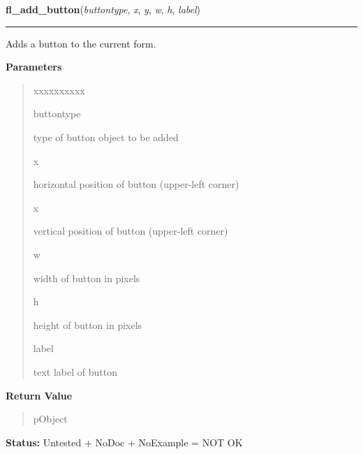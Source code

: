     \label{xformslib:library:fl_add_button}

    \vspace{0.5ex}

\hspace{.8\funcindent}\begin{boxedminipage}{\funcwidth}

    \raggedright \textbf{fl\_add\_button}(\textit{buttontype}, \textit{x}, \textit{y}, \textit{w}, \textit{h}, \textit{label})

    \vspace{-1.5ex}

    \rule{\textwidth}{0.5\fboxrule}
\setlength{\parskip}{2ex}
    Adds a button to the current form.

\setlength{\parskip}{1ex}
      \textbf{Parameters}
      \vspace{-1ex}

      \begin{quote}
        \begin{Ventry}{xxxxxxxxxx}

          \item[buttontype]

          type of button object to be added

          \item[x]

          horizontal position of button (upper-left corner)

          \item[x]

          vertical position of button (upper-left corner)

          \item[w]

          width of button in pixels

          \item[h]

          height of button in pixels

          \item[label]

          text label of button

        \end{Ventry}

      \end{quote}

      \textbf{Return Value}
    \vspace{-1ex}

      \begin{quote}
      pObject

      \end{quote}

\textbf{Status:} Untested + NoDoc + NoExample = NOT OK



    \end{boxedminipage}

